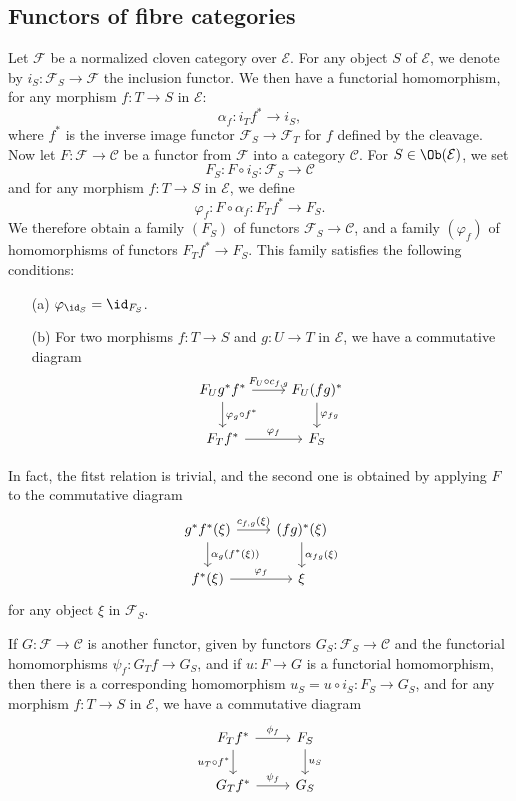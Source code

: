 \subsection{Functors of fibre categories}
Let $\mathcal{F}$ be a normalized cloven category over $\mathcal{E}$. For any object $S$ of $\mathcal{E}$, we denote by $i_S:\mathcal{F}_S\to \mathcal{F}$ the inclusion functor. We then have a functorial homomorphism, for any morphism $f:T\to S$ in $\mathcal{E}$:
\[\alpha_f:i_Tf^*\to i_S,\]
where $f^*$ is the inverse image functor $\mathcal{F}_S\to \mathcal{F}_T$ for $f$ defined by the cleavage. Now let $F:\mathcal{F}\to \mathcal{C}$ be a functor from $\mathcal{F}$ into a category $\mathcal{C}$. For $S\in\Ob(\mathcal{E})$, we set
\[F_S:F\circ i_S:\mathcal{F}_S\to \mathcal{C}\]
and for any morphism $f:T\to S$ in $\mathcal{E}$, we define
\[\varphi_f:F\circ\alpha_f:F_Tf^*\to F_S.\]
We therefore obtain a family $(F_S)$ of functors $\mathcal{F}_S\to \mathcal{C}$, and a family $(\varphi_f)$ of homomorphisms of functors $F_Tf^*\to F_S$. This family satisfies the following conditions:
\begin{enumerate}
\item[(a)] $\varphi_{\id_S}=\id_{F_S}$.
\item[(b)] For two morphisms $f:T\to S$ and $g:U\to T$ in $\mathcal{E}$, we have a commutative diagram
\[\begin{tikzcd}
F_Ug^*f^*\ar[r,"F_U\circ c_{f,g}"]\ar[d,"\varphi_g\circ f^*"]&F_U(fg)^*\ar[d,"\varphi_{fg}"]\\
F_Tf^*\ar[r,"\varphi_f"]&F_S
\end{tikzcd}\]
\end{enumerate}
In fact, the fitst relation is trivial, and the second one is obtained by applying $F$ to the commutative diagram
\[\begin{tikzcd}
g^*f^*(\xi)\ar[r,"c_{f,g}(\xi)"]\ar[d,"\alpha_g(f^*(\xi))"]&(fg)^*(\xi)\ar[d,"\alpha_{fg}(\xi)"]\\
f^*(\xi)\ar[r,"\varphi_f"]&\xi
\end{tikzcd}\]
for any object $\xi$ in $\mathcal{F}_S$.\par
If $G:\mathscr{F}\to \mathcal{C}$ is another functor, given by functors $G_S:\mathcal{F}_S\to \mathcal{C}$ and the functorial homomorphisms $\psi_f:G_Tf\to G_S$, and if $u:F\to G$ is a functorial homomorphism, then there is a corresponding homomorphism $u_S=u\circ i_S:F_S\to G_S$, and for any morphism $f:T\to S$ in $\mathcal{E}$, we have a commutative diagram
\begin{equation}\label{fibre cat functor diagram-1}
\begin{tikzcd}
F_Tf^*\ar[r,"\phi_f"]\ar[d,swap,"u_T\circ f^*"]&F_S\ar[d,"u_S"]\\
G_Tf^*\ar[r,"\psi_f"]&G_S
\end{tikzcd}
\end{equation}
